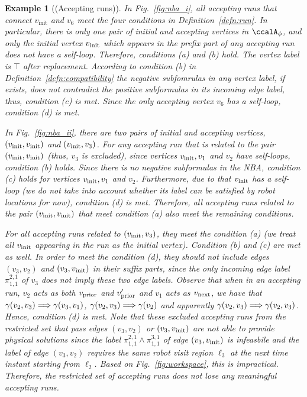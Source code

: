 \documentclass[Afour,sageh,times]{sagej}
\newtheorem{exmp}{Example}
\newcommand{\autop}{\ccalA_{\phi}}
\newcommand{\vertex}[1]{v_{\textup{#1}}}
\newcommand{\simplies}{\DOTSB\Longrightarrow}
\renewcommand{\ap}[3]{\mathcal{\pi}_{{#1},{#2}}^{#3}}
\newenvironment{cexmp}
{\addtocounter{exmp}{-1}\begin{exmp}}
  {\end{exmp}}
\begin{document}
\begin{cexmp}[(Accepting runs)]
  In Fig.~\ref{fig:nba_i}, all accepting runs that connect $v_{\text{init}}$ and $v_6$ meet the four conditions in Definition~\ref{defn:run}. In particular, there is only one pair of initial and accepting vertices in $\autop$, and only the initial vertex $\vertex{init}$ which appears in the prefix part of any accepting run does not have a self-loop. Therefore, conditions (a) and (b) hold.  The vertex label is $\top$ after replacement. According to condition (b) in Definition~\ref{defn:compatibility} the negative subfomrulas in any vertex label, if exists,  does not contradict the positive subformulas in its incoming edge label, thus, condition (c) is met. Since the only accepting vertex $v_6$ has a self-loop, condition (d) is met.

  In Fig.~\ref{fig:nba_ii}, there are two pairs of initial and accepting vertices, $(\vertex{init}, \vertex{init})$ and $(\vertex{init}, v_3)$. For any accepting run that is related to the pair $(\vertex{init}, \vertex{init})$ (thus, $v_3$ is excluded), since vertices $\vertex{init}, v_1$ and $v_2$ have self-loops, condition (b) holds. Since there is no negative subformulas in the NBA, condition (c)  holds for vertices $\vertex{init}, v_1$ and $v_2$. Furthermore, due to that $\vertex{init}$ has a self-loop (we do not take into account whether its label can be satisfied by robot locations for now), condition (d) is met. Therefore, all accepting runs related to the pair $(\vertex{init}, \vertex{init})$ that meet condition (a) also meet the remaining conditions.

  For all accepting runs related to $(\vertex{init}, v_3)$, they meet the condition (a) (we treat all $\vertex{init}$ appearing in the run  as  the initial vertex). Condition (b) and (c) are met as well. In order to meet the condition (d),  they  should not include edges $(v_3, v_2)$ and $(v_3, \vertex{init})$ in their suffix parts, since the only incoming edge label $\ap{1}{1}{2,1}$ of $v_3$ does not imply these two edge labels. Observe that when in an accepting run, $v_2$ acts as both $\vertex{prior}$ and $\vertex{prior}'$ and $v_1$ acts as $\vertex{next}$, we have that $\gamma(v_2, v_3) \simplies \gamma(v_3, v_1)$, $\gamma(v_2, v_3) \simplies \gamma(v_2)$ and apparently $\gamma(v_2, v_3) \simplies \gamma(v_2, v_3)$. Hence, condition (d) is met.  Note that these excluded  accepting runs from the restricted set that pass edges $(v_3, v_2)$ or $(v_3, \vertex{init})$  are not able to provide physical solutions since the label $\ap{1}{1}{2,1} \wedge \ap{1}{1}{3,1}$ of edge $(v_3, \vertex{init})$ is infeasbile and the label of edge $(v_3, v_2)$ requires the same robot visit region $\ell_3$ at the next time instant starting from $\ell_2$. Based on Fig.~\ref{fig:workspace}, this is impractical. Therefore, the restricted set of accepting runs does not lose any  meaningful accepting runs.


\end{cexmp}
\end{document}
